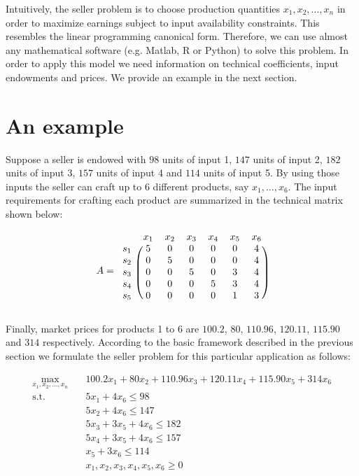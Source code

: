 \documentclass[12pt]{article}         %
\begin{document}
Intuitively, the seller problem is to choose production quantities $x_1,x_2,...,x_n$ in order to maximize earnings subject to input availability constraints. This resembles the linear programming canonical form. Therefore, we can use almost any mathematical software (e.g. Matlab, R or Python) to solve this problem. In order to apply this model we need information on technical coefficients, input endowments and prices. We provide an example in the next section.

\section{An example}
Suppose a seller is endowed with $98$ units of input 1, $147$ units of input 2, $182$ units of input 3, $157$ units of input 4 and $114$ units of input 5. By using those inputs the seller can craft up to 6 different products, say $x_1,...,x_6$. The input requirements for crafting each product are summarized in the technical matrix shown below:

\[
A =
\begin{blockarray}{ccccccc}
& x_1 & x_2 & x_3 & x_4 & x_5 & x_6 \\
\begin{block}{c(cccccc)}
  s_1 & 5 & 0 & 0 & 0 & 0 & 4  \\
  s_2 & 0 & 5 & 0 & 0 & 0 & 4  \\
  s_3 & 0 & 0 & 5 & 0 & 3 & 4  \\
  s_4 & 0 & 0 & 0 & 5 & 3 & 4  \\
  s_5 & 0 & 0 & 0 & 0 & 1 & 3  \\
\end{block}
\end{blockarray}
 \]

Finally, market prices for products 1 to 6 are $100.2$, $80$, $110.96$, $120.11$, $115.90$ and $314$ respectively. According to the basic framework described in the previous section we formulate the seller problem for this particular application as follows:

\begin{equation}
\begin{aligned}
\max_{x_1,x_2,...,x_n} \quad & 100.2x_1 + 80x_2 + 110.96x_3 + 120.11x_4 + 115.90x_5 + 314x_6 \\
\textrm{s.t.} \quad & 5x_1 + 4x_6 \leq 98\\
  & 5x_2 + 4x_6 \leq 147\\
  & 5x_3 + 3x_5 + 4x_6 \leq 182\\
  & 5x_4 + 3x_5 + 4x_6 \leq 157\\
  & x_5 + 3x_6 \leq 114\\
  & x_1,x_2,x_3,x_4,x_5,x_6 \geq 0
\end{aligned}
\end{equation}
\end{document}
